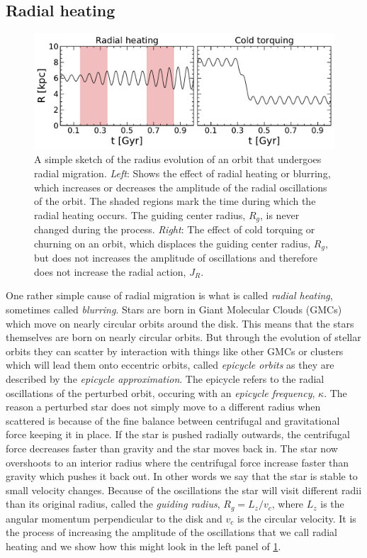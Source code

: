 \subsection{Radial heating}
\begin{figure}[t]
    \centering
    \includegraphics[width=1\textwidth]{images/radialmigration.pdf}
    \caption{A simple sketch of the radius evolution of an orbit that undergoes radial migration. \textit{Left}: Shows the effect of radial heating or blurring, which increases or decreases the amplitude of the radial oscillations of the orbit. The shaded regions mark the time during which the radial heating occurs. The guiding center radius, $R_g$, is never changed during the process. \textit{Right}: The effect of cold torquing or churning on an orbit, which displaces the guiding center radius, $R_g$, but does not increases the amplitude of oscillations and therefore does not increase the radial action, $J_R$.} %
    \label{fig:radialmigration}
\end{figure}

One rather simple cause of radial migration is what is called \textit{radial heating}, sometimes called \textit{blurring}. Stars are born in Giant Molecular Clouds (GMCs) which move on nearly circular orbits around the disk. This means that the stars themselves are born on nearly circular orbits. But through the evolution of stellar orbits they can scatter by interaction with things like other GMCs or clusters which will lead them onto eccentric orbits, called \textit{epicycle orbits} as they are described by the \textit{epicycle approximation}. The epicycle refers to the radial oscillations of the perturbed orbit, occuring with an \textit{epicycle frequency}, $\kappa$. The reason a perturbed star does not simply move to a different radius when scattered is because of the fine balance between centrifugal and gravitational force keeping it in place. If the star is pushed radially outwards, the centrifugal force decreases faster than gravity and the star moves back in. The star now overshoots to an interior radius where the centrifugal force increase faster than gravity which pushes it back out. In other words we say that the star is stable to small velocity changes. Because of the oscillations the star will visit different radii than its original radius, called the \textit{guiding radius}, $R_g = L_z / v_c$, where $L_z$ is the angular momentum perpendicular to the disk and $v_c$ is the circular velocity. It is the process of increasing the amplitude of the oscillations that we call radial heating and we show how this might look in the left panel of \ref{fig:radialmigration}. 

